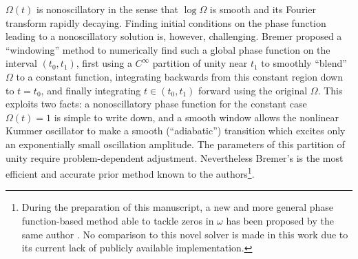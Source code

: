 \documentclass[10pt]{article}
\newcommand{\om}{\omega}
\begin{document}
$\Omega(t)$ is
nonoscillatory in the sense that $\log \Omega$ is smooth and its Fourier transform rapidly decaying.
Finding initial conditions on the phase function leading to
a nonoscillatory solution is, however, challenging.
Bremer proposed a ``windowing'' method to numerically find such a global phase function on the interval $(t_0,t_1)$,
first using a $C^\infty$ partition of unity near $t_1$ to smoothly ``blend'' $\Omega$ to
a constant function, integrating backwards from this constant region
down to $t = t_0$, and finally integrating $t \in (t_0,t_1)$ forward using the original $\Omega$.
This exploits two facts: a nonoscillatory phase function for
the constant case $\Omega(t) = 1$ is simple to write down, and
a smooth window allows the nonlinear Kummer oscillator to make a smooth 
(``adiabatic'')
transition which excites only an exponentially small oscillation amplitude.
The parameters of this partition of unity require problem-dependent
adjustment.
Nevertheless Bremer's is the most efficient
and accurate prior method known to the authors\footnote{During the preparation
of this manuscript, a new and more general phase function-based method able to
tackle zeros in $\om$ has been proposed by the same author
\cite{bremer2022turningp}. No comparison to this novel solver is made in this
work due to its current lack of publicly available implementation. }.
\end{document}
